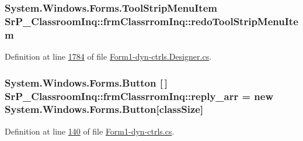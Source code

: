 \hypertarget{class_sr_p___classroom_inq_1_1frm_classrrom_inq_a1b4d7ae0d344dc1fda1561a1d652fa6c}{
\subsubsection[{redo\-Tool\-Strip\-Menu\-Item}]{\setlength{\rightskip}{0pt plus 5cm}\-System.\-Windows.\-Forms.\-Tool\-Strip\-Menu\-Item {\bf \-Sr\-P\-\_\-\-Classroom\-Inq\-::frm\-Classrrom\-Inq\-::redo\-Tool\-Strip\-Menu\-Item}}}
\label{class_sr_p___classroom_inq_1_1frm_classrrom_inq_a1b4d7ae0d344dc1fda1561a1d652fa6c}


\-Definition at line \hyperlink{_form1-dyn-ctrls_8_designer_8cs_source_l01784}{1784} of file \hyperlink{_form1-dyn-ctrls_8_designer_8cs_source}{\-Form1-\/dyn-\/ctrls.\-Designer.\-cs}.

\hypertarget{class_sr_p___classroom_inq_1_1frm_classrrom_inq_a46ee30d934a5219840e4381a66728f0f}{
\subsubsection[{reply\-\_\-arr}]{\setlength{\rightskip}{0pt plus 5cm}\-System.\-Windows.\-Forms.\-Button \mbox{[}$\,$\mbox{]} {\bf \-Sr\-P\-\_\-\-Classroom\-Inq\-::frm\-Classrrom\-Inq\-::reply\-\_\-arr} = new \-System.\-Windows.\-Forms.\-Button\mbox{[}{\bf class\-Size}\mbox{]}}}
\label{class_sr_p___classroom_inq_1_1frm_classrrom_inq_a46ee30d934a5219840e4381a66728f0f}


\-Definition at line \hyperlink{_form1-dyn-ctrls_8cs_source_l00140}{140} of file \hyperlink{_form1-dyn-ctrls_8cs_source}{\-Form1-\/dyn-\/ctrls.\-cs}.

